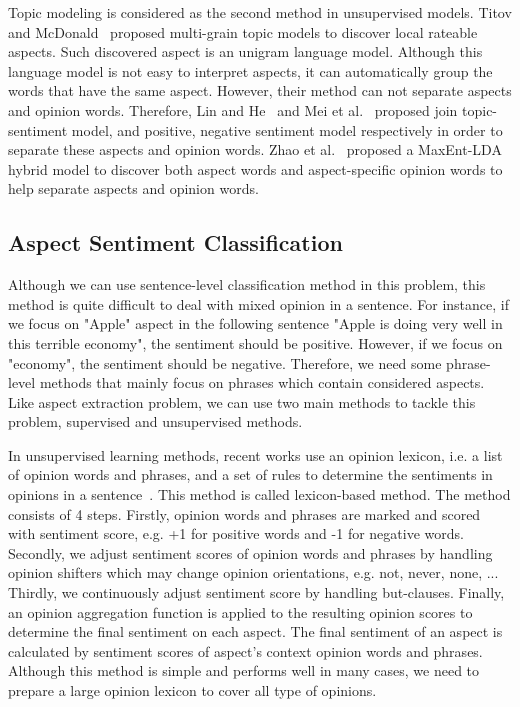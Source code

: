\documentclass{article}
\begin{document}
Topic modeling is considered as the second method in unsupervised models.
Titov and McDonald~\cite{Titov:2008:MOR:1367497.1367513} proposed multi-grain topic models to discover local rateable aspects. 
Such discovered aspect is an unigram language model.
Although this language model is not easy to interpret aspects, it can automatically group the words that have the same aspect.
However, their method can not separate aspects and opinion words.
Therefore, Lin and He~\cite{Lin:2009:JSM:1645953.1646003} and Mei et al.~\cite{Mei:2007:TSM:1242572.1242596} proposed join topic-sentiment model, and positive, negative sentiment model respectively in order to separate these aspects and opinion words.
Zhao et al.~\cite{citeulike:9605702} proposed a MaxEnt-LDA hybrid model to discover both aspect words and aspect-specific opinion words to help separate aspects and opinion words.

\subsection{Aspect Sentiment Classification}
Although we can use sentence-level classification method in this problem, this method is quite difficult to deal with mixed opinion in a sentence.
For instance, if we focus on "Apple" aspect in the following sentence "Apple is doing very well in this terrible economy", the sentiment should be positive. 
However, if we focus on "economy", the sentiment should be negative.
Therefore, we need some phrase-level methods that mainly focus on phrases which contain considered aspects.
Like aspect extraction problem, we can use two main methods to tackle this problem, supervised and unsupervised methods.

In unsupervised learning methods, recent works use an opinion lexicon, i.e. a list of opinion words and phrases, and a set of rules to determine the sentiments in opinions in a sentence~\cite{Ding:2008:HLA:1341531.1341561,Hu:2004:MSC:1014052.1014073}. 
This method is called lexicon-based method.
The method consists of 4 steps.
Firstly, opinion words and phrases are marked and scored with sentiment score, e.g. +1 for positive words and -1 for negative words.
Secondly, we adjust sentiment scores of opinion words and phrases by handling opinion shifters which may change opinion orientations, e.g. not, never, none, ...
Thirdly, we continuously adjust sentiment score by handling but-clauses.
Finally, an opinion aggregation function is applied to the resulting opinion scores to determine the final sentiment on each aspect.
The final sentiment of an aspect is calculated by sentiment scores of aspect's context opinion words and phrases.
Although this method is simple and performs well in many cases, we need to prepare a large opinion lexicon to cover all type of opinions. 
\end{document}
